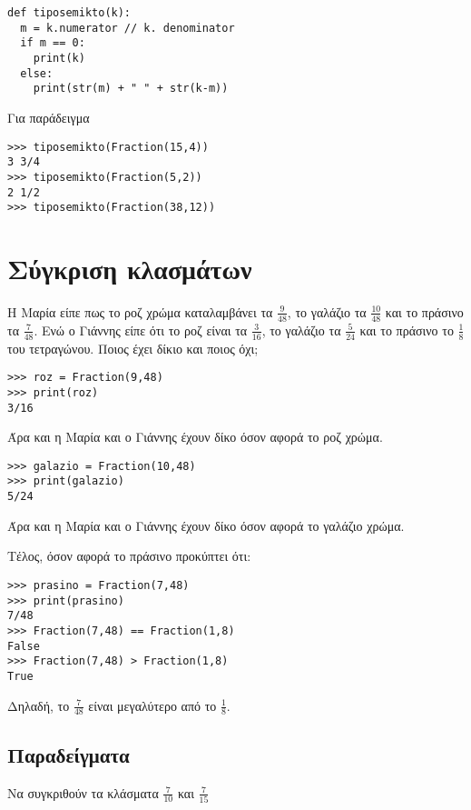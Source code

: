 \begin{lstlisting}
def tiposemikto(k):
  m = k.numerator // k. denominator
  if m == 0:
  	print(k)
  else:
  	print(str(m) + " " + str(k-m))
\end{lstlisting}

Για παράδειγμα
\begin{lstlisting}
>>> tiposemikto(Fraction(15,4))
3 3/4
>>> tiposemikto(Fraction(5,2))
2 1/2
>>> tiposemikto(Fraction(38,12))
\end{lstlisting}

\section{Σύγκριση κλασμάτων}

\begin{exercise}
Η Μαρία είπε πως το ροζ χρώμα καταλαμβάνει τα $\frac{9}{48}$, το γαλάζιο τα $\frac{10}{48}$ και το πράσινο τα $\frac{7}{48}$. Ενώ ο Γιάννης είπε ότι το ροζ είναι τα $\frac{3}{16}$, το γαλάζιο τα $\frac{5}{24}$ και το πράσινο το $\frac{1}{8}$ του τετραγώνου.
Ποιος έχει δίκιο και ποιος όχι;
\end{exercise}

\begin{lstlisting}
>>> roz = Fraction(9,48)
>>> print(roz)
3/16
\end{lstlisting}
Άρα και η Μαρία και ο Γιάννης έχουν δίκο όσον αφορά το ροζ χρώμα.

\begin{lstlisting}
>>> galazio = Fraction(10,48)
>>> print(galazio)
5/24
\end{lstlisting}
Άρα και η Μαρία και ο Γιάννης έχουν δίκο όσον αφορά το γαλάζιο χρώμα.

Τέλος, όσον αφορά το πράσινο προκύπτει ότι:
\begin{lstlisting}
>>> prasino = Fraction(7,48)
>>> print(prasino)
7/48
>>> Fraction(7,48) == Fraction(1,8)
False
>>> Fraction(7,48) > Fraction(1,8)
True
\end{lstlisting}
Δηλαδή, το $\frac{7}{48}$ είναι μεγαλύτερο από το $\frac{1}{8}$.

\subsection{Παραδείγματα}

\begin{exercise}Να συγκριθούν τα κλάσματα $\frac{7}{10}$ και $\frac{7}{15}$\end{exercise}

